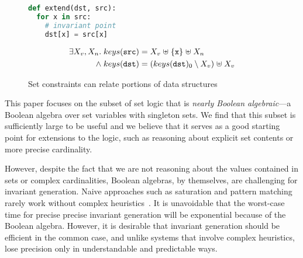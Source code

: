\begin{figure}[tb]
  \newbox\exprogbox
  \begin{lrbox}{\exprogbox}
    \begin{minipage}[t][1cm][b]{0.4\textwidth}
      \begin{lstlisting}[language=python]
def extend(dst, src):
  for x in src:
    # invariant point
    dst[x] = src[x]
      \end{lstlisting}
    \end{minipage}
  \end{lrbox}
  \newbox\exproginv
  \begin{lrbox}{\exproginv}
    \begin{minipage}[t][0.9cm][b]{0.4\textwidth}
      \begin{align*}
        \exists X_v, X_n. \; keys(\texttt{src})
        & = X_v \mathrel{\uplus} \{\texttt{x}\} \mathrel{\uplus} X_n
        \\
        {} \mathrel{\wedge} keys(\texttt{dst})
        & = (keys(\texttt{dst})_0 \setminus X_v) \mathrel{\uplus} X_v
      \end{align*}
    \end{minipage}
  \end{lrbox}
  \centering
  \quad
  \caption{Set constraints can relate portions of data structures}
  \label{fig:intro-example}
\end{figure}

This paper focuses on the subset of set logic that is \emph{nearly
  Boolean algebraic}---a Boolean algebra over set variables with
singleton sets.
We find that this subset is sufficiently large to be useful and we
believe that it serves as a good starting point for extensions to the
logic, such as reasoning about explicit set contents or more precise
cardinality.

However, despite the fact that we are not reasoning about the values contained in sets or complex cardinalities, Boolean algebras, by themselves, are challenging for invariant generation.  Naive approaches such as saturation and pattern matching rarely work without complex heuristics~\cite{fixbag:cav:11,ab:ecoop:13}.  It is unavoidable that the worst-case time for precise precise invariant generation will be exponential because of the Boolean algebra. However, it is desirable that invariant generation should be efficient in the common case, and unlike systems that involve complex heuristics, lose precision only in understandable and predictable ways.

